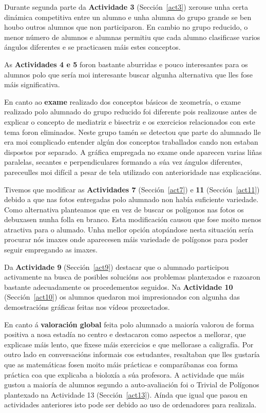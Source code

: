 Durante segunda parte da \textbf{Actividade 3} (Sección~\ref{act3}) xerouse unha certa dinámica competitiva entre un alumno e unha alumna do grupo grande se ben houbo outros alumnos que non participaron. En cambio no grupo reducido, o menor número de alumnos e alumnas permitiu que cada alumno clasificase varios ángulos diferentes e se practicasen máis estes conceptos.

As \textbf{Actividades 4 e 5} foron bastante aburridas e pouco interesantes para os alumnos polo que sería moi interesante buscar algunha alternativa que lles fose máis significativa.

En canto ao \textbf{exame} realizado dos conceptos básicos de xeometría, o exame realizado polo alumnado do grupo reducido foi diferente pois realizouse antes de explicar o concepto de mediatriz e bisectriz e os exercicios relacionados con este tema foron eliminados. Neste grupo tamén se detectou que parte do alumnado lle era moi complicado entender algún dos conceptos traballados cando non estaban dispostos por separado. A gráfica empregada no exame onde aparecen varias liñas paralelas, secantes e perpendiculares formando a súa vez ángulos diferentes, pareceulles moi difícil a pesar de tela utilizado con anterioridade nas explicacións.

Tivemos que modificar as \textbf{Actividades 7} (Sección~\ref{act7}) e \textbf{11} (Sección~\ref{act11}) debido a que nas fotos entregadas polo alumnado non había suficiente variedade. Como alternativa planteamos que en vez de buscar os polígonos nas fotos os debuxasen nunha folla en branco. Esta modificación causou que fose moito menos atractiva para o alumado. Unha mellor opción atopándose nesta situación sería procurar nós imaxes onde aparecesen máis variedade de polígonos para poder seguir empregando as imaxes.

Da \textbf{Actividade 9} (Sección~\ref{act9}) destacar que o alumnado participou activamente na busca de posibles solucións aos problemas plantexados e razoaron bastante adecuadamente os procedementos seguidos. Na \textbf{Actividade 10} (Sección~\ref{act10}) os alumnos quedaron moi impresionados con algunha das demostracións gráficas feitas nos vídeos proxectados.

En canto á \textbf{valoración global} feita polo alumnado a maioría valorou de forma positiva a nosa estadía no centro e destacaron como aspectos a mellorar, que explicase máis lento, que fixese máis exercicios e que mellorase a caligrafía. Por outro lado en conversacións informais cos estudantes, resaltaban que lles gustaría que as matemáticas fosen moito máis prácticas e comparábanas coa forma práctica coa que explicaba a bioloxía a súa profesora. A actividade que máis gustou a maioría de alumnos segundo a auto-avaliación foi o Trivial de Polígonos plantexado na Actividade 13 (Sección~\ref{act13}). Aínda que igual que pasou en actividades anteriores isto pode ser debido ao uso de ordenadores para realizala.

